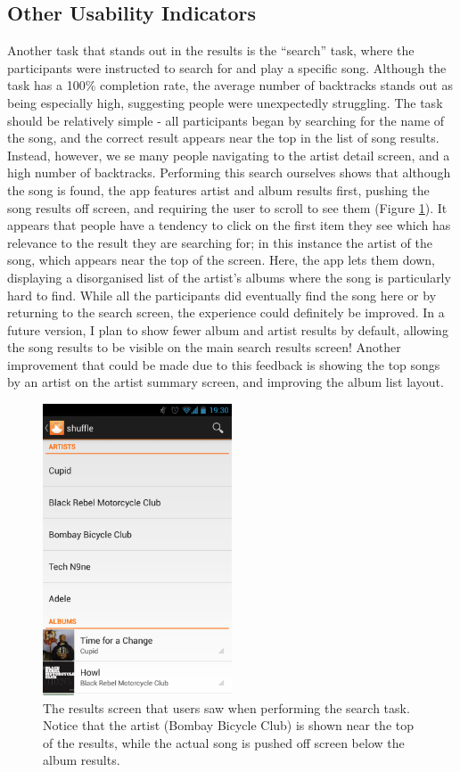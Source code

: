 \subsection{Other Usability Indicators}

Another task that stands out in the results is the ``search'' task, where the participants
were instructed to search for and play a specific song. Although the task has a 100\% completion
rate, the average number of backtracks stands out as being especially high, suggesting people
were unexpectedly struggling. The task should be relatively simple - all participants
began by searching for the name of the song, and the correct result appears near the top
in the list of song results. Instead, however, we se many people navigating to the artist
detail screen, and a high number of backtracks. Performing this search ourselves shows that
although the song is found, the app features artist and album results first, pushing the
song results off screen, and requiring the user to scroll to see them (Figure
\ref{fig:search-results}). It appears that people
have a tendency to click on the first item they see which has relevance to the result they
are searching for; in this instance the artist of the song, which appears near the top
of the screen. Here, the app lets them down, displaying a disorganised list of the artist's
albums where the song is particularly hard to find. While all the participants did eventually
find the song here or by returning to the search screen, the experience could definitely be
improved. In a future version, I plan to show fewer album and artist results by default,
allowing the song results to be visible on the main search results screen! Another improvement
that could be made due to this feedback is showing the top songs by an artist on the artist
summary screen, and improving the album list layout.

\begin{figure}[h]
  \centering 
  \includegraphics[width=0.5\textwidth]{images/search-results}
  \caption{The results screen that users saw when performing the search task.
           Notice that the artist (Bombay Bicycle Club) is shown near the top of the
           results, while the actual song is pushed off screen below the album
           results.}
  \label{fig:search-results}
\end{figure}

